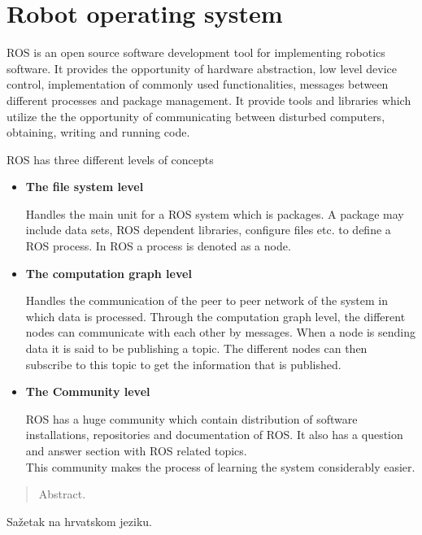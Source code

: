 \documentclass[times, utf8, diplomski, english]{fer}
\begin{document}
\chapter{Robot operating system}\label{sec:def_ROS}
ROS is an open source software development tool for implementing robotics software. It provides the opportunity of hardware abstraction, low level device control, implementation of commonly used functionalities, messages between different processes and package management. It provide tools and libraries which utilize the the opportunity of communicating between disturbed computers, obtaining, writing and running code.


ROS has three different levels of concepts

\begin{itemize}
\item \textbf{The file system level}

Handles the main unit for a ROS system which is packages. A package may include data sets, ROS dependent libraries, configure files etc. to define a ROS process. In ROS a process is denoted as a node. 
\item \textbf{The computation graph level}

Handles the communication of the peer to peer network of the system in which data is processed. Through the computation graph level, the different nodes can communicate with each other by messages. When a node is sending data it is said to be publishing a topic. The different nodes can then subscribe to this topic to get the information that is published.
\item \textbf{The Community level}

ROS has a huge community which contain distribution of software installations, repositories and documentation of ROS. It also has a question and answer section with ROS related topics.\\
This community makes the process of learning the system considerably easier.
\end{itemize}
\begin{abstract}
Abstract.

\end{abstract}

\begin{sazetak}
Sažetak na hrvatskom jeziku.

\end{sazetak}
\end{document}

